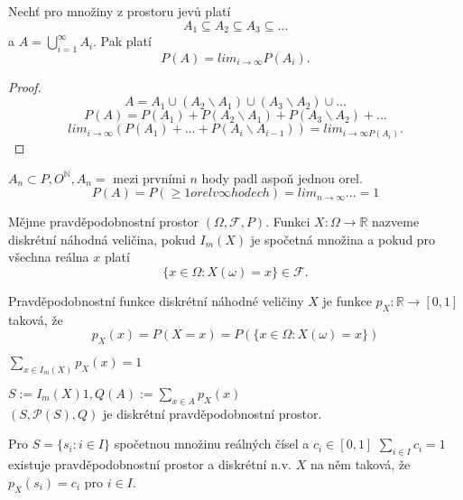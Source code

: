\documentclass[../main.tex]{subfiles}
\begin{document}
\begin{definition}
    Nechť pro množiny z prostoru jevů platí
    \[A_1 \subseteq A_2 \subseteq A_3 \subseteq \dots\]
    a $A = \bigcup^\infty_{i=1}A_i$. Pak platí
    \[P(A) = lim_{i\rightarrow \infty} P(A_i).\]
    \begin{proof}
        \[A = A_1 \cup (A_2\backslash A_1)\cup (A_3\backslash A_2) \cup \dots\]
        \[P(A) = P(A_1) + P(A_2\backslash A_1) + P(A_3\backslash A_2) + \dots\]
        \[lim_{i\rightarrow \infty} (P(A_1) + \dots + P(A_i \backslash A_{i-1})) = lim_{i\rightarrow \infty P(A_i)}.\]
    \end{proof}
 
    $A_n \subset {P,O}^\mathbb{N}, A_n = $ mezi prvními $n$ hody padl aspoň jednou orel.
    \[P(A) = P(\geq 1 orel v \infty hodech) = lim_{n\rightarrow \infty} \dots = 1\]
\end{definition}

\begin{definition}
    Mějme pravděpodobnostní prostor $(\Omega, \mathcal{F}, P).$ Funkci $X : \Omega \rightarrow \mathbb{R}$
    nazveme diskrétní náhodná veličina, pokud $I_m(X)$ je spočetná množina a pokud pro všechna reálna $x$ platí
    \[\{x \in \Omega : X(\omega) = x\} \in \mathcal{F}.\]
\end{definition}

\begin{definition}
    Pravděpodobnostní funkce diskrétní náhodné veličiny $X$ je funkce $p_X : \mathbb{R} \rightarrow [0,1]$ taková, že 
    \[p_X(x) = P(X = x) = P(\{x \in \Omega : X(\omega) = x\})\]
\end{definition}

\begin{definition}
    $\sum_{x\in I_m(X)}p_X(x) = 1$
\end{definition}

\begin{definition}
    $S:= I_m(X) 1, Q(A):=\sum_{x\in A} p_X(x)$\\
    $(S,\mathcal{P}(S),Q)$ je diskrétní pravděpodobnostní prostor.
\end{definition}

\begin{definition}
    Pro $S = \{s_i : i \in I\}$ spočetnou množinu reálných čísel a $c_i \in [0,1]$ $\sum_{i\in I} c_i =1$ existuje pravděpodobnostní
    prostor a diskrétní n.v. $X$ na něm taková, že $p_X(s_i) = c_i$ pro $i \in I$.
\end{definition}
\end{document}
